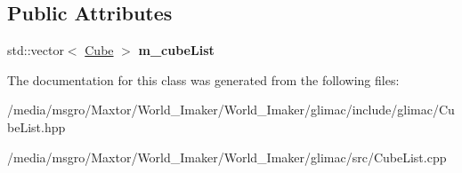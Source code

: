 \subsection*{Public Attributes}
\begin{DoxyCompactItemize}
\item 
\mbox{\label{classglimac_1_1CubeList_a571bd6927341c00bba36750788a6eda8}} 
std\+::vector$<$ \hyperlink{classglimac_1_1Cube}{Cube} $>$ {\bfseries m\+\_\+cube\+List}
\end{DoxyCompactItemize}


The documentation for this class was generated from the following files\+:\begin{DoxyCompactItemize}
\item 
/media/msgro/\+Maxtor/\+World\+\_\+\+Imaker/\+World\+\_\+\+Imaker/glimac/include/glimac/Cube\+List.\+hpp\item 
/media/msgro/\+Maxtor/\+World\+\_\+\+Imaker/\+World\+\_\+\+Imaker/glimac/src/Cube\+List.\+cpp\end{DoxyCompactItemize}
